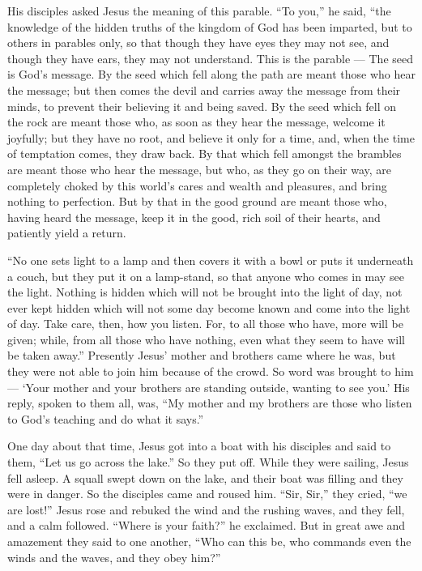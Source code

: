  His disciples asked Jesus the meaning of this parable.
 ``To you,'' he said, ``the knowledge of the hidden truths
of the kingdom of God has been imparted, but to others in parables only,
so that though they have eyes they may not see, and though they have
ears, they may not understand.  This is the parable --- The
seed is God's message.  By the seed which fell along the
path are meant those who hear the message; but then comes the devil and
carries away the message from their minds, to prevent their believing it
and being saved.  By the seed which fell on the rock are
meant those who, as soon as they hear the message, welcome it joyfully;
but they have no root, and believe it only for a time, and, when the
time of temptation comes, they draw back.  By that which
fell amongst the brambles are meant those who hear the message, but who,
as they go on their way, are completely choked by this world's cares and
wealth and pleasures, and bring nothing to perfection.  But
by that in the good ground are meant those who, having heard the
message, keep it in the good, rich soil of their hearts, and patiently
yield a return.

 ``No one sets light to a lamp and then covers it with a
bowl or puts it underneath a couch, but they put it on a lamp-stand, so
that anyone who comes in may see the light.  Nothing is
hidden which will not be brought into the light of day, not ever kept
hidden which will not some day become known and come into the light of
day.  Take care, then, how you listen. For, to all those
who have, more will be given; while, from all those who have nothing,
even what they seem to have will be taken away.'' 
Presently Jesus' mother and brothers came where he was, but they were
not able to join him because of the crowd.  So word was
brought to him --- `Your mother and your brothers are standing outside,
wanting to see you.'  His reply, spoken to them all, was,
``My mother and my brothers are those who listen to God's teaching and
do what it says.''

 One day about that time, Jesus got into a boat with his
disciples and said to them, ``Let us go across the lake.'' 
So they put off. While they were sailing, Jesus fell asleep. A squall
swept down on the lake, and their boat was filling and they were in
danger.  So the disciples came and roused him. ``Sir,
Sir,'' they cried, ``we are lost!'' Jesus rose and rebuked the wind and
the rushing waves, and they fell, and a calm followed. 
``Where is your faith?'' he exclaimed. But in great awe and amazement
they said to one another, ``Who can this be, who commands even the winds
and the waves, and they obey him?''

